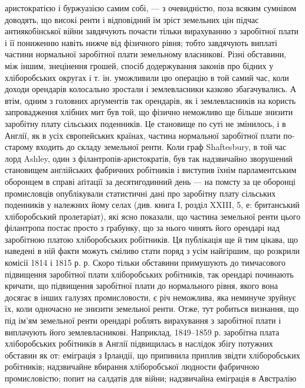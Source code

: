 \parcont{}  %
аристократією і буржуазією самим собі, — з очевидністю, поза всяким сумнівом
доводять, що високі ренти і відповідний їм зріст земельних цін підчас антиякобінської
війни завдячують почасти тільки вирахуванню з заробітної плати
і її пониженню навіть нижче від фізичного рівня; тобто завдячують виплаті
частини нормальної заробітної плати земельному власникові. Різні обставини,
між іншим, знецінення грошей, спосіб додержування законів про бідних
у хліборобських округах і т. ін. уможливили цю операцію в той самий час, коли
доходи орендарів колосально зростали і землевласники казково збагачувались.
А втім, одним з головних арґументів так орендарів, як і землевласників на
користь запровадження хлібних мит був той, що фізично неможливо ще більше
знизити заробітну плату сільських поденників. Це становище по суті не змінилось,
і в Англії, як в усіх європейських країнах, частина нормальної
заробітної плати по-старому входить до складу земельної ренти. Коли
граф Shaftesbury, в той час лорд Ashley, один з філантропів-аристократів,
був так надзвичайно зворушений становищем англійських фабричних робітників
і виступив їхнім парламентським оборонцем в справі аґітації за десятигодинний
день — на помсту за це оборонці промисловців опублікували статистичні
дані про заробітну плату сільських поденників у належних йому селах (див.
книга І, розділ XXIII, 5, е: британський хліборобський пролетаріат), які
ясно показали, що частина земельної ренти цього філантропа постає просто
з грабунку, що за нього чинять його орендарі над заробітною платою
хліборобських робітників. Ця публікація ще й тим цікава, що наведені в ній
факти можуть сміливо стати поряд з усім найгіршим, що розкрили комісії
1814 і 1815 р. р. Скоро тільки обставини примушують до тимчасового підвищення
заробітної плати хліборобських робітників, так орендарі починають кричати, що
підвищення заробітної плати до нормального рівня, якого вона досягає в інших
галузях промисловости, є річ неможлива, яка неминуче зруйнує їх, коли
одночасно не знизити земельної ренти. Отже, тут робиться визнання, що під
ім’ям земельної ренти орендарі роблять вирахування з заробітної плати і виплачують
його землевласникові. Наприклад, 1849--1859 р. заробітна плата хліборобських
робітників в Англії підвищилась в наслідок збігу потужних обставин
як от: еміграція з Ірландії, що припинила приплив звідти хліборобських
робітників; надзвичайне вбирання хліборобської людности фабричною промисловістю;
попит на салдатів для війни; надзвичайна еміграція в Австралію
